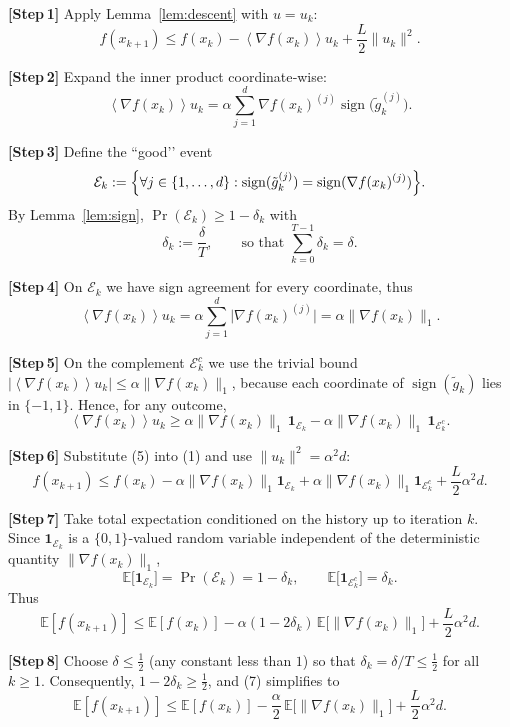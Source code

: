 \documentclass{article}
\newcommand{\E}{\mathbb{E}}
\newcommand{\sign}{\operatorname{sign}}
\newcommand{\inner}[1]{\left\langle#1\right\rangle}
\begin{document}
\noindent\textbf{[Step 1]} Apply Lemma~\ref{lem:descent} with $u=u_k$:
\[
f(x_{k+1})\le f(x_k)-\inner{\nabla f(x_k)}{u_k}+\frac{L}{2}\|u_k\|^{2}.
\tag{1}
\]

\noindent\textbf{[Step 2]} Expand the inner product coordinate‑wise:
\[
\inner{\nabla f(x_k)}{u_k}
=\alpha\sum_{j=1}^{d}\nabla f(x_k)^{(j)}\sign\!\bigl(\tilde{g}_k^{(j)}\bigr).
\tag{2}
\]

\noindent\textbf{[Step 3]} Define the ``good’’ event
\[
\mathcal{E}_k:=\Bigl\{\forall j\in\{1,\dots,d\}:
\sign(\tilde{g}_k^{(j)})=\sign(\nabla f(x_k)^{(j)})\Bigr\}.
\]
By Lemma~\ref{lem:sign}, $\Pr(\mathcal{E}_k)\ge 1-\delta_k$ with
\[
\delta_k:=\frac{\delta}{T},
\qquad\text{so that }\sum_{k=0}^{T-1}\delta_k=\delta .
\tag{3}
\]

\noindent\textbf{[Step 4]} On $\mathcal{E}_k$ we have sign agreement for every
coordinate, thus
\[
\inner{\nabla f(x_k)}{u_k}
= \alpha\sum_{j=1}^{d}\bigl|\nabla f(x_k)^{(j)}\bigr|
= \alpha\|\nabla f(x_k)\|_{1}.
\tag{4}
\]

\noindent\textbf{[Step 5]} On the complement $\mathcal{E}_k^{c}$ we use the trivial bound
$|\inner{\nabla f(x_k)}{u_k}|\le \alpha\|\nabla f(x_k)\|_{1}$, because each
coordinate of $\sign(\tilde{g}_k)$ lies in $\{-1,1\}$.  Hence, for any outcome,
\[
\inner{\nabla f(x_k)}{u_k}
\ge \alpha\|\nabla f(x_k)\|_{1}\,\mathbf{1}_{\mathcal{E}_k}
-\alpha\|\nabla f(x_k)\|_{1}\,\mathbf{1}_{\mathcal{E}_k^{c}}.
\tag{5}
\]

\noindent\textbf{[Step 6]} Substitute (5) into (1) and use $\|u_k\|^{2}= \alpha^{2}d$:
\[
f(x_{k+1})\le f(x_k)-\alpha\|\nabla f(x_k)\|_{1}\mathbf{1}_{\mathcal{E}_k}
+\alpha\|\nabla f(x_k)\|_{1}\mathbf{1}_{\mathcal{E}_k^{c}}
+\frac{L}{2}\alpha^{2}d.
\tag{6}
\]

\noindent\textbf{[Step 7]} Take total expectation conditioned on the history up to
iteration $k$.  Since $\mathbf{1}_{\mathcal{E}_k}$ is a $\{0,1\}$‑valued
random variable independent of the deterministic quantity $\|\nabla f(x_k)\|_{1}$,
\[
\E\!\bigl[\mathbf{1}_{\mathcal{E}_k}\bigr]=\Pr(\mathcal{E}_k)=1-\delta_k,
\qquad
\E\!\bigl[\mathbf{1}_{\mathcal{E}_k^{c}}\bigr]=\delta_k .
\]
Thus
\[
\E[f(x_{k+1})]\le \E[f(x_k)]
-\alpha(1-2\delta_k)\,\E\!\bigl[\|\nabla f(x_k)\|_{1}\bigr]
+\frac{L}{2}\alpha^{2}d.
\tag{7}
\]

\noindent\textbf{[Step 8]} Choose $\delta\le \tfrac12$ (any constant less than $1$) so that
$\delta_k=\delta/T\le \tfrac12$ for all $k\ge1$.  Consequently,
$1-2\delta_k\ge \tfrac12$, and (7) simplifies to
\[
\E[f(x_{k+1})]\le \E[f(x_k)]
-\frac{\alpha}{2}\,\E\!\bigl[\|\nabla f(x_k)\|_{1}\bigr]
+\frac{L}{2}\alpha^{2}d.
\tag{8}
\]
\end{document}
